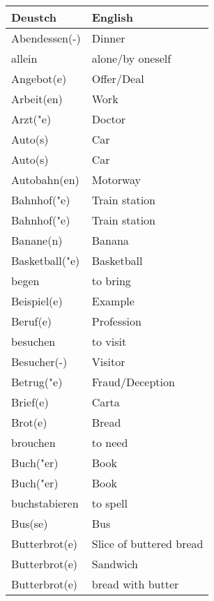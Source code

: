 \documentclass{article}
\renewcommand{\arraystretch}{1}
\begin{document}
\begin{minipage}{0.48\textwidth}
    \centering
    \renewcommand{\arraystretch}{1.5}
    \begin{tabular}{|>{\raggedright\arraybackslash}p{3.5cm}|>{\raggedright\arraybackslash}p{3.5cm}|}
        \hline
        \rowcolor{gray!20} \textbf{Deustch} & \textbf{English} \\
        \hline
        Abendessen(-) & Dinner \\\hline
        allein & alone/by oneself \\\hline
        Angebot(e) & Offer/Deal \\\hline
        Arbeit(en) & Work \\\hline
        Arzt("e) & Doctor \\\hline
        Auto(s) & Car \\\hline
        Auto(s) & Car \\\hline
        Autobahn(en) & Motorway \\\hline
        Bahnhof("e) & Train station \\\hline
        Bahnhof("e) & Train station \\\hline
        Banane(n) & Banana \\\hline
        Basketball("e) & Basketball \\\hline
        begen & to bring \\\hline
        Beispiel(e) & Example \\\hline
        Beruf(e) & Profession \\\hline
        besuchen & to visit \\\hline
        Besucher(-) & Visitor \\\hline
        Betrug("e) & Fraud/Deception \\\hline
        Brief(e) & Carta \\\hline
        Brot(e) & Bread \\\hline
        brouchen & to need \\\hline
        Buch("er) & Book \\\hline
        Buch("er) & Book \\\hline
        buchstabieren & to spell \\\hline
        Bus(se) & Bus \\\hline
        Butterbrot(e) & Slice of buttered bread \\\hline
        Butterbrot(e) & Sandwich \\\hline
        Butterbrot(e) & bread with butter \\\hline

\end{tabular}
\end{minipage}
\end{document}
